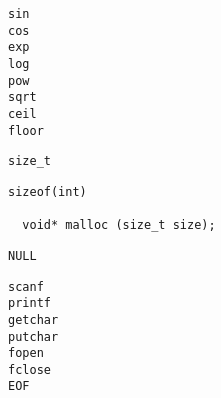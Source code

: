 \begin{frame}{}
  \centerline{\large {}}

  \begin{center}
    {\large
    \texttt{sin}\\[0.10cm]
    \texttt{cos}\\[0.40cm]

    \texttt{exp}\\[0.10cm]
    \texttt{log}\\[0.40cm]

    \texttt{pow}\\[0.10cm]
    \texttt{sqrt}\\[0.40cm]

    \texttt{ceil}\\[0.10cm]
    \texttt{floor}\\[0.40cm]
    }
  \end{center}
\end{frame}

\begin{frame}{}
  \centerline{\large {}}
\end{frame}

\begin{frame}[fragile]{}
  \centerline{\large {}}

  \centerline{\large \texttt{size\_t}}
  \begin{lstlisting}[style = Cstyle]
  sizeof(int)

  void* malloc (size_t size);
  \end{lstlisting}

  \centerline{\large \texttt{NULL}}
\end{frame}

\begin{frame}{}
  \centerline{\large {}}

  \begin{center}
    {\large
    \texttt{scanf}\\[0.10cm]
    \texttt{printf}\\[0.40cm]

    \texttt{getchar}\\[0.10cm]
    \texttt{putchar}\\[0.40cm]

    \texttt{fopen}\\[0.10cm]
    \texttt{fclose}\\[0.40cm]

    \texttt{EOF}\\[0.10cm]
    }
  \end{center}
\end{frame}

